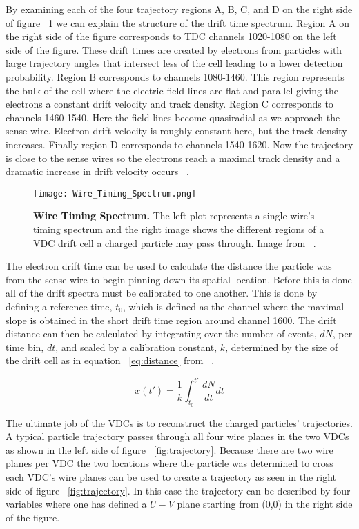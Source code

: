 By examining each of the four trajectory regions A, B, C, and D on the right side of figure ~\ref{fig:drift} we can explain the structure of the drift time spectrum. Region A on the right side of the figure corresponds to TDC channels 1020-1080 on the left side of the figure. These drift times are created by electrons from particles with large trajectory angles that intersect less of the cell leading to a lower detection probability. Region B corresponds to channels 1080-1460. This region represents the bulk of the cell where the electric field lines are flat and parallel giving the electrons a constant drift velocity and track density. Region C corresponds to channels 1460-1540. Here the field lines become quasiradial as we approach the sense wire. Electron drift velocity is roughly constant here, but the track density increases. Finally region D corresponds to channels 1540-1620. Now the trajectory is close to the sense wires so the electrons reach a maximal track density and a dramatic increase in drift velocity occurs ~\cite{Article:VDCs}.

\begin{figure}[!ht]
\begin{center}
\texttt{[image: Wire\_Timing\_Spectrum.png]}
\end{center}
\caption{
{\bf{Wire Timing Spectrum.}} The left plot represents a single wire's timing spectrum and the right image shows the different regions of a VDC drift cell a charged particle may pass through. Image from ~\cite{Article:VDCs}.}
\label{fig:drift}
\end{figure}

The electron drift time can be used to calculate the distance the particle was from the sense wire to begin pinning down its spatial location. Before this is done all of the drift spectra must be calibrated to one another. This is done by defining a reference time, $t_0$, which is defined as the channel where the maximal slope is obtained in the short drift time region around channel 1600. The drift distance can then be calculated by integrating over the number of events, $dN$, per time bin, $dt$, and scaled by a calibration constant, $k$, determined by the size of the drift cell as in equation ~\ref{eq:distance} from ~\cite{Article:VDCs}.

\begin{equation} \label{eq:distance}
	x(t') = \frac{1}{k} \int_{t_0}^{t'} \frac{dN}{dt} dt
\end{equation}

The ultimate job of the VDCs is to reconstruct the charged particles' trajectories. A typical particle trajectory passes through all four wire planes in the two VDCs as shown in the left side of figure ~\ref{fig:trajectory}. Because there are two wire planes per VDC the two locations where the particle was determined to cross each VDC's wire planes can be used to create a trajectory as seen in the right side of figure ~\ref{fig:trajectory}. In this case the trajectory can be described by four variables where one has defined a $U-V$ plane starting from (0,0) in the right side of the figure. 

